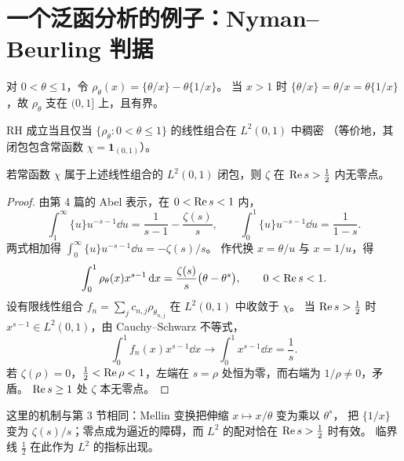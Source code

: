 \documentclass[11pt]{article}
\begin{document}
\section{一个泛函分析的例子：Nyman--Beurling 判据}
对 $0<\theta\le1$，令 $\rho_\theta(x)=\{\theta/x\}-\theta\{1/x\}$。
当 $x>1$ 时 $\{\theta/x\}=\theta/x=\theta\{1/x\}$，故 $\rho_\theta$ 支在 $(0,1]$ 上，且有界。
\begin{theorem}
RH 成立当且仅当 $\{\rho_\theta:0<\theta\le1\}$ 的线性组合在 $L^2(0,1)$ 中稠密
（等价地，其闭包包含常函数 $\chi=\mathbf 1_{(0,1)}$）。
\end{theorem}
\begin{proposition}\label{prop:nb}
若常函数 $\chi$ 属于上述线性组合的 $L^2(0,1)$ 闭包，则 $\zeta$ 在 $\operatorname{Re} s>\tfrac12$ 内无零点。
\end{proposition}
\begin{proof}
由第 4 篇的 Abel 表示，在 $0<\operatorname{Re} s<1$ 内，
\[
 \int_1^\infty\{u\}u^{-s-1}\dd u=\frac1{s-1}-\frac{\zeta(s)}s,
 \qquad
 \int_0^1\{u\}u^{-s-1}\dd u=\frac1{1-s}.
\]
两式相加得 $\int_0^\infty\{u\}u^{-s-1}\dd u=-\zeta(s)/s$。
作代换 $x=\theta/u$ 与 $x=1/u$，得
\[
 \int_0^1\rho_\theta(x)x^{s-1}\,\mathrm d x=\frac{\zeta(s)}{s}\bigl(\theta-\theta^s\bigr),\qquad 0<\operatorname{Re} s<1 .
\]
设有限线性组合 $f_n=\sum_jc_{n,j}\rho_{\theta_{n,j}}$ 在 $L^2(0,1)$ 中收敛于 $\chi$。
当 $\operatorname{Re} s>\tfrac12$ 时 $x^{s-1}\in L^2(0,1)$，由 Cauchy--Schwarz 不等式，
\[
 \int_0^1f_n(x)x^{s-1}\dd x\longrightarrow\int_0^1x^{s-1}\dd x=\frac1s .
\]
若 $\zeta(\rho)=0$，$\tfrac12<\operatorname{Re}\rho<1$，左端在 $s=\rho$ 处恒为零，而右端为 $1/\rho\ne0$，矛盾。
$\operatorname{Re} s\ge1$ 处 $\zeta$ 本无零点。
\end{proof}
这里的机制与第 3 节相同：Mellin 变换把伸缩 $x\mapsto x/\theta$ 变为乘以 $\theta^s$，
把 $\{1/x\}$ 变为 $\zeta(s)/s$；零点成为逼近的障碍，而 $L^2$ 的配对恰在 $\operatorname{Re} s>\tfrac12$ 时有效。
临界线 $\tfrac12$ 在此作为 $L^2$ 的指标出现。
\end{document}

